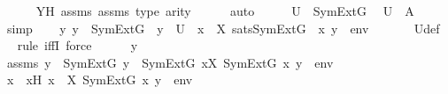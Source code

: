 \begin{isabellebody}
\ \ \ \ \isamarkupfalse%
\ YH\ assms\ assms{}\ {\isasympsi}{\isacharunderscore}{\kern0pt}type\ arity{\isacharunderscore}{\kern0pt}{\isasympsi}\isanewline
\ \ \ \ \isamarkupfalse%
\ auto\isanewline
\ \ \isamarkupfalse%
\ \isamarkupfalse%
\ {\isachardoublequoteopen}U\ {\isasymin}\ SymExt{\isacharparenleft}{\kern0pt}G{\isacharparenright}{\kern0pt}{\isachardoublequoteclose}\ \isamarkupfalse%
\ {\isacartoucheopen}U\ {\isacharequal}{\kern0pt}\ {\isacharquery}{\kern0pt}A{\isacartoucheclose}\ \isamarkupfalse%
\ simp\isanewline
\isanewline
\ \ \isamarkupfalse%
\ {\isachardoublequoteopen}{\isasymAnd}y{\isachardot}{\kern0pt}\ y\ {\isasymin}\ SymExt{\isacharparenleft}{\kern0pt}G{\isacharparenright}{\kern0pt}\ {\isasymLongrightarrow}\ y\ {\isasymin}\ U\ {\isasymlongleftrightarrow}\ {\isacharparenleft}{\kern0pt}{\isasymexists}x\ {\isasymin}\ X{\isachardot}{\kern0pt}\ sats{\isacharparenleft}{\kern0pt}SymExt{\isacharparenleft}{\kern0pt}G{\isacharparenright}{\kern0pt}{\isacharcomma}{\kern0pt}\ {\isasymphi}{\isacharcomma}{\kern0pt}\ {\isacharbrackleft}{\kern0pt}x{\isacharcomma}{\kern0pt}\ y{\isacharbrackright}{\kern0pt}\ {\isacharat}{\kern0pt}\ env{\isacharparenright}{\kern0pt}{\isacharparenright}{\kern0pt}{\isachardoublequoteclose}\ \isanewline
\ \ \ \ \isamarkupfalse%
\ U{\isacharunderscore}{\kern0pt}def\ \isanewline
\ \ \isamarkupfalse%
{\isacharparenleft}{\kern0pt}rule\ iffI{\isacharcomma}{\kern0pt}\ force{\isacharparenright}{\kern0pt}\isanewline
\ \ \ \ \isamarkupfalse%
\ y\ \isanewline
\ \ \ \ \isamarkupfalse%
\ assms{}{\isacharcolon}{\kern0pt}\ {\isachardoublequoteopen}y\ {\isasymin}\ SymExt{\isacharparenleft}{\kern0pt}G{\isacharparenright}{\kern0pt}{\isachardoublequoteclose}\ {\isachardoublequoteopen}y\ {\isasymin}\ SymExt{\isacharparenleft}{\kern0pt}G{\isacharparenright}{\kern0pt}{\isachardoublequoteclose}\ {\isachardoublequoteopen}{\isasymexists}x{\isasymin}X{\isachardot}{\kern0pt}\ SymExt{\isacharparenleft}{\kern0pt}G{\isacharparenright}{\kern0pt}{\isacharcomma}{\kern0pt}\ {\isacharbrackleft}{\kern0pt}x{\isacharcomma}{\kern0pt}\ y{\isacharbrackright}{\kern0pt}\ {\isacharat}{\kern0pt}\ env\ {\isasymTurnstile}\ {\isasymphi}{\isachardoublequoteclose}\ \isanewline
\ \ \ \ \isamarkupfalse%
\ \isamarkupfalse%
\ x\ \ xH{\isacharcolon}{\kern0pt}\ {\isachardoublequoteopen}x\ {\isasymin}\ X{\isachardoublequoteclose}\ {\isachardoublequoteopen}SymExt{\isacharparenleft}{\kern0pt}G{\isacharparenright}{\kern0pt}{\isacharcomma}{\kern0pt}\ {\isacharbrackleft}{\kern0pt}x{\isacharcomma}{\kern0pt}\ y{\isacharbrackright}{\kern0pt}\ {\isacharat}{\kern0pt}\ env\ {\isasymTurnstile}\ {\isasymphi}{\isachardoublequoteclose}\ \isamarkupfalse%

\end{isabellebody}
